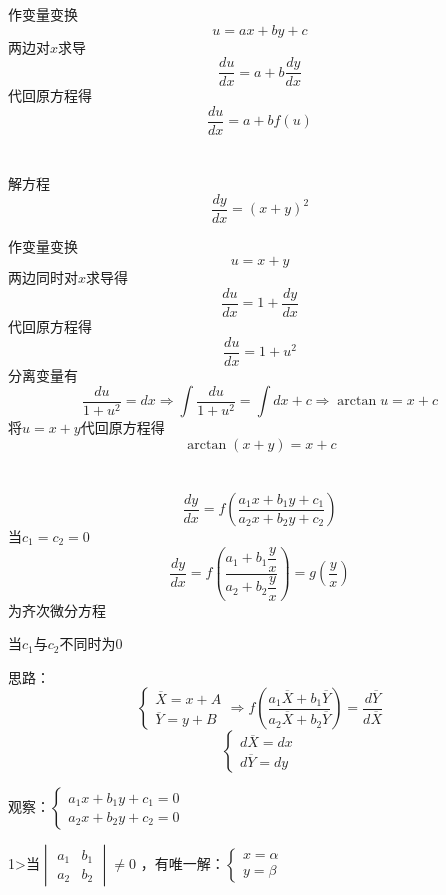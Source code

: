 \documentclass[oneside]{book} %
\begin{document}
\indent 作变量变换
$$u = ax + by + c$$
\indent 两边对$x$求导
$$\frac{du}{dx} = a + b\frac{dy}{dx}$$
\indent 代回原方程得
$$\frac{du}{dx} = a + bf(u)$$
\\ \hspace*{\fill} \\
\noindent {}解方程
$$\dfrac{dy}{dx} = (x + y)^{2}$$

\noindent {}

作变量变换
$$u = x + y$$
\indent 两边同时对$x$求导得
$$\dfrac{du}{dx} = 1 + \dfrac{dy}{dx}$$
\indent 代回原方程得
$$\dfrac{du}{dx} = 1 + u^{2}$$
\indent 分离变量有
$$\dfrac{du}{1 + u^{2}} = dx \Rightarrow \int \frac{du}{1 + u^{2}} = \int dx + c \Rightarrow \arctan u = x + c$$
\indent 将$u = x + y$代回原方程得
$$\arctan(x + y) = x + c$$
\\ \hspace*{\fill} \\
\noindent {}
$$\dfrac{dy}{dx} = f\left(\frac{a_{1}x + b_{1}y + c_{1}}{a_{2}x + b_{2}y + c_{2}}\right) $$
当$c_{1} = c_{2} = 0 $
$$\frac{dy}{dx} = f\left(\frac{a_{1} + b_{1}\dfrac{y}{x}}{a_{2} + b_{2}\dfrac{y}{x}}\right) = g\left(\dfrac{y}{x}\right)$$
为齐次微分方程

当$c_{1}$与$c_{2}$不同时为$0$

思路：
$$
\begin{cases}
    \overline{X} = x + A \\ 
    \overline{Y} = y + B  
\end{cases} 
\Rightarrow f\left(\frac{a_{1}\overline{X} + b_{1}\overline{Y}}{a_{2}\overline{X} + b_{2}\overline{Y}} \right) = \frac{d\overline{Y} }{d\overline{X} }$$
$$
\begin{cases}
    d\overline{X} = dx \\
    d\overline{Y} = dy  
\end{cases}$$

观察：$
\begin{cases}
    a_{1}x + b_{1}y + c_{1} = 0 \\
    a_{2}x + b_{2}y + c_{2} = 0
\end{cases}$

1>当$
\begin{vmatrix}
    a_{1} & b_{1} \\
    a_{2} & b_{2}
\end{vmatrix} \neq 0 $
，有唯一解：$
\begin{cases}
    x = \alpha \\
    y = \beta
\end{cases}$
\end{document}

